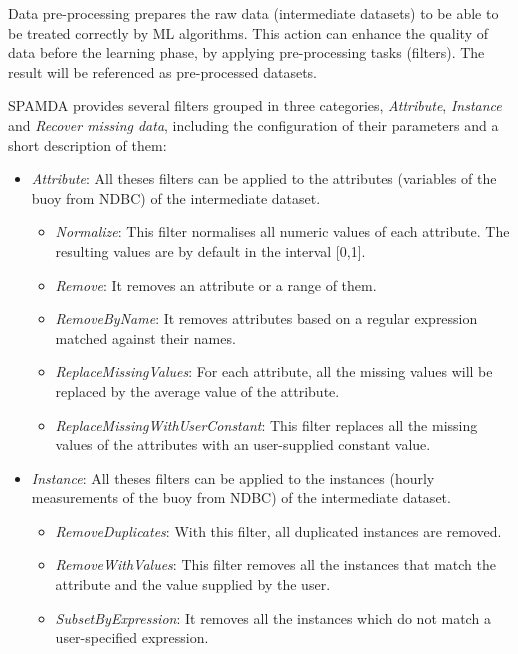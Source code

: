 \documentclass[energies,article,submit,moreauthors,pdftex]{Definitions/mdpi}
\begin{document}
				Data pre-processing prepares the raw data (intermediate datasets) to be able to be treated correctly by ML algorithms. This action can enhance the quality of data before the learning phase, by applying pre-processing tasks (filters). The result will be referenced as pre-processed datasets.
				
				SPAMDA provides several filters grouped in three categories, \textit{Attribute}, \textit{Instance} and \textit{Recover missing data}, including the configuration of their parameters and a short description of them:
				
				\begin{itemize}

				 \item \textit{Attribute}: All theses filters can be applied to the attributes (variables of the buoy from NDBC) of the intermediate dataset.
				 
					\begin{itemize}
						\item \textit{Normalize}: This filter normalises all numeric values of each attribute. The resulting values are by default in the interval [0,1].
						\item \textit{Remove}: It removes an attribute or a range of them.
						\item \textit{RemoveByName}: It removes attributes based on a regular expression matched against their names.
						\item \textit{ReplaceMissingValues}: For each attribute, all the missing values will be replaced by the average value of the attribute.
						\item \textit{ReplaceMissingWithUserConstant}: This filter replaces all the missing values of the attributes with an user-supplied constant value.
					\end{itemize}
				 
				 \item \textit{Instance}: All theses filters can be applied to the instances (hourly measurements of the buoy from NDBC) of the intermediate dataset.
					\begin{itemize}
						\item \textit{RemoveDuplicates}: With this filter, all duplicated instances are removed.
						\item \textit{RemoveWithValues}: This filter removes all the instances that match the attribute and the value supplied by the user.
						\item \textit{SubsetByExpression}: It removes all the instances which do not match a user-specified expression.
					\end{itemize}
				 

\end{itemize}
\end{document}
